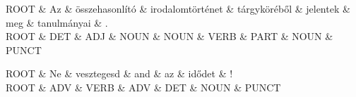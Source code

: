 \documentclass{minimal}
\begin{document}
\begin{dependency}
\begin{deptext}
ROOT \& Az \& összehasonlító \& irodalomtörténet \& tárgyköréből \& jelentek \& meg \& tanulmányai \& . \\
ROOT \& DET \& ADJ \& NOUN \& NOUN \& VERB \& PART \& NOUN \& PUNCT \\
\end{deptext}
\end{dependency}


\begin{dependency}
\begin{deptext}
ROOT \& Ne \& vesztegesd \& and \& az \& idődet \& ! \\
ROOT \& ADV \& VERB \& ADV \& DET \& NOUN \& PUNCT \\
\end{deptext}
\end{dependency}
\end{document}
